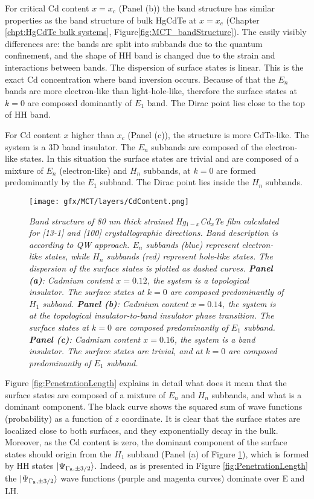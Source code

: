 \documentclass[titlepage,a4paper]{book}
\begin{document}
For critical Cd content $x = x_c$ (Panel (b)) the band structure has similar properties as the band structure of bulk HgCdTe at $x = x_c$ (Chapter \ref{chpt:HgCdTe bulk systems}, Figure\ref{fig:MCT_bandStructure}). The easily visibly differences are: the bands are split into subbands due to the quantum confinement, and the shape of HH band is changed due to the strain and interactions between bands. The dispersion of surface states is linear. This is the exact Cd concentration where band inversion occurs. Because of that the $E_n$ bands are more electron-like than light-hole-like, therefore the surface states at $k = 0$ are composed dominantly of $E_1$ band. The Dirac point lies close to the top of HH band.

For Cd content $x$ higher than $x_c$ (Panel (c)), the structure is more CdTe-like. The system is a 3D band insulator. The $E_n$ subbands are composed of the electron-like states. In this situation the surface states are trivial and are composed of a mixture of $E_n$ (electron-like) and $H_n$ subbands, at $k = 0$ are formed predominantly by the $E_1$ subband. The Dirac point lies inside the $H_n$ subbands.

\begin{figure}[ht]
	\centering
	\texttt{[image: gfx/MCT/layers/CdContent.png]}
	\vspace{-10pt}
	\caption{\textit{Band structure of 80 nm thick strained Hg$_{1-x}$Cd$_x$Te film calculated for [13-1] and [100] crystallographic directions. Band description is according to QW approach. $E_n$ subbands (blue) represent electron-like states, while $H_n$ subbands (red) represent hole-like states. The dispersion of the surface states is plotted as dashed curves. \textbf{Panel (a)}: Cadmium content $x = 0.12$, the system is a topological insulator. The surface states at $k = 0$ are composed predominantly of $H_1$ subband. \textbf{Panel (b)}: Cadmium content $x = 0.14$, the system is at the topological insulator-to-band insulator phase transition. The surface states at $k = 0$ are composed predominantly of $E_1$ subband. \textbf{Panel (c)}: Cadmium content $x = 0.16$, the system is a band insulator. The surface states are trivial, and at $k = 0$ are composed predominantly of $E_1$ subband.}}
	\label{fig:CdContent}
\end{figure} 

Figure \ref{fig:PenetrationLength} explains in detail what does it mean that the surface states are composed of a mixture of $E_n$ and $H_n$ subbands, and what is a dominant component. The black curve shows the squared sum of wave functions (probability) as a function of $z$ coordinate. It is clear that the surface states are localized close to both surfaces, and they exponentially decay in the bulk. Moreover, as the Cd content is zero, the dominant component of the surface states should origin from the $H_1$ subband (Panel (a) of Figure \ref{fig:CdContent}), which is formed by HH states $\ket{\Psi_{\Gamma_8, \pm 3/2}}$. Indeed, as is presented in Figure \ref{fig:PenetrationLength} the $\ket{\Psi_{\Gamma_8, \pm 3/2}}$ wave functions (purple and magenta curves) dominate over E and LH.  
\end{document}
